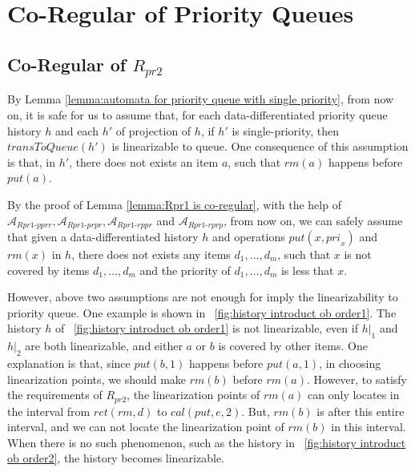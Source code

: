 \section{Co-Regular of Priority Queues}
\label{sec:co-regular of priority queues}









\subsection{Co-Regular of $R_{\textit{pr2}}$}
\label{subsec:co-regular of Rpr2}



By Lemma \ref{lemma:automata for priority queue with single priority}, from now on, it is safe for us to assume that, for each data-differentiated priority queue history $h$ and each $h'$ of projection of $h$, if $h'$ is single-priority, then $\textit{transToQueue}(h')$ is linearizable to queue. One consequence of this assumption is that, in $h'$, there does not exists an item $a$, such that $\textit{rm}(a)$ happens before $\textit{put}(a)$.

By the proof of Lemma \ref{lemma:Rpr1 is co-regular}, with the help of $\mathcal{A}_{\textit{Rpr1-pprr}}, \mathcal{A}_{\textit{Rpr1-prpr}}, \mathcal{A}_{\textit{Rpr1-rppr}}$ and $\mathcal{A}_{\textit{Rpr1-rprp}}$, from now on, we can safely assume that given a data-differentiated history $h$ and operations $\textit{put}(x,\textit{pri}_x)$ and $\textit{rm}(x)$ in $h$, there does not exists any items $d_1,\ldots,d_m$, such that $x$ is not covered by items $d_1,\ldots,d_m$ and the priority of $d_1,\ldots,d_m$ is less that $x$.


However, above two assumptions are not enough for imply the linearizability to priority queue. One example is shown in \figurename~\ref{fig:history introduct ob order1}. The history $h$ of \figurename~\ref{fig:history introduct ob order1} is not linearizable, even if $h \vert_{1}$ and $h \vert_{2}$ are both linearizable, and either $a$ or $b$ is covered by other items. One explanation is that, since $\textit{put}(b,1)$ happens before $\textit{put}(a,1)$, in choosing linearization points, we should make $\textit{rm}(b)$ before $\textit{rm}(a)$. However, to satisfy the requirements of $R_{\textit{pr2}}$, the linearization points of $\textit{rm}(a)$ can only locates in the interval from $\textit{ret}(\textit{rm},d)$ to $\textit{cal}(\textit{put},e,2)$. But, $\textit{rm}(b)$ is after this entire interval, and we can not locate the linearization point of $\textit{rm}(b)$ in this interval. When there is no such phenomenon, such as the history in \figurename~\ref{fig:history introduct ob order2}, the history becomes linearizable.

